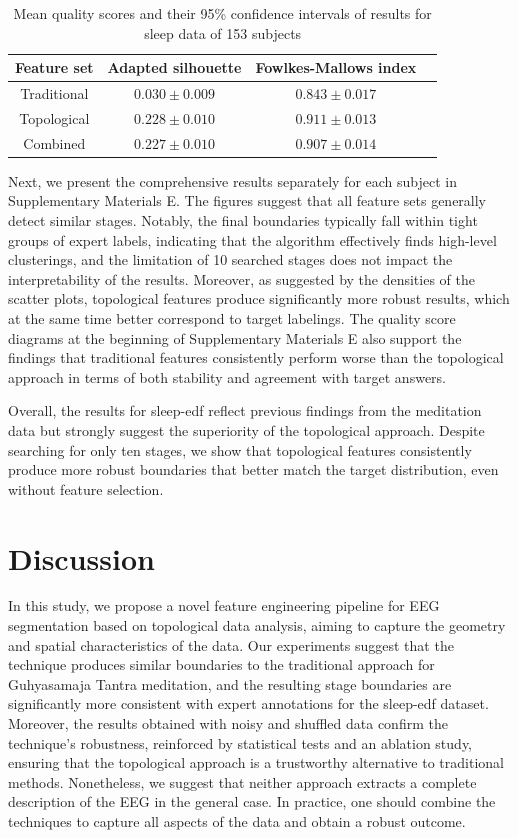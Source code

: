\documentclass[pdflatex,sn-basic,Numbered]{sn-jnl}
\begin{document}
\begin{table}
\caption{Mean quality scores and their 95\% confidence intervals of results for sleep data of 153 subjects}
\label{table1}
\begin{tabular}{cccc}
  \toprule
    Feature set & Adapted silhouette & Fowlkes-Mallows index \\
  \midrule
    Traditional & $0.030 \pm 0.009$  & $0.843 \pm 0.017$ \\
    Topological & $0.228 \pm 0.010 $ & $0.911 \pm 0.013$ \\
    Combined &  $0.227 \pm 0.010 $ & $0.907 \pm 0.014$ \\
  \bottomrule
\end{tabular}
\end{table}

Next, we present the comprehensive results separately for each subject in Supplementary Materials E. The figures suggest that all feature sets generally detect similar stages. Notably, the final boundaries typically fall within tight groups of expert labels, indicating that the algorithm effectively finds high-level clusterings, and the limitation of 10 searched stages does not impact the interpretability of the results. Moreover, as suggested by the densities of the scatter plots, topological features produce significantly more robust results, which at the same time better correspond to target labelings. The quality score diagrams at the beginning of Supplementary Materials E also support the findings that traditional features consistently perform worse than the topological approach in terms of both stability and agreement with target answers.

Overall, the results for sleep-edf reflect previous findings from the meditation data but strongly suggest the superiority of the topological approach. Despite searching for only ten stages, we show that topological features consistently produce more robust boundaries that better match the target distribution, even without feature selection.\@

\section{Discussion}

In this study, we propose a novel feature engineering pipeline for EEG segmentation based on topological data analysis, aiming to capture the geometry and spatial characteristics of the data. Our experiments suggest that the technique produces similar boundaries to the traditional approach for Guhyasamaja Tantra meditation, and the resulting stage boundaries are significantly more consistent with expert annotations for the sleep-edf dataset. Moreover, the results obtained with noisy and shuffled data confirm the technique's robustness, reinforced by statistical tests and an ablation study, ensuring that the topological approach is a trustworthy alternative to traditional methods. Nonetheless, we suggest that neither approach extracts a complete description of the EEG in the general case. In practice, one should combine the techniques to capture all aspects of the data and obtain a robust outcome.
\end{document}
